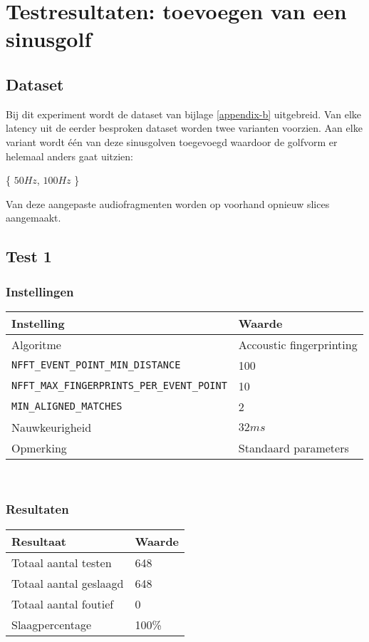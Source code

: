 \chapter{Testresultaten: toevoegen van een sinusgolf}
\label{appendix-d}

\section*{Dataset}

Bij dit experiment wordt de dataset van bijlage \ref{appendix-b} uitgebreid. Van elke latency uit de eerder besproken dataset worden twee varianten voorzien. Aan elke variant wordt één van deze sinusgolven toegevoegd waardoor de golfvorm er helemaal anders gaat uitzien:

\begin{center}
	\{ $50Hz$, $100Hz$ \}
\end{center}

Van deze aangepaste audiofragmenten worden op voorhand opnieuw slices aangemaakt. 

\section*{Test 1}

\subsection*{Instellingen}

\begin{tabular}{ l  l}
	\hline
	\textbf{Instelling} & \textbf{Waarde} \\
	\hline
	Algoritme & Accoustic fingerprinting \\
	\texttt{NFFT\_EVENT\_POINT\_MIN\_DISTANCE} & 100 \\
	\texttt{NFFT\_MAX\_FINGERPRINTS\_PER\_EVENT\_POINT} & 10 \\
	\texttt{MIN\_ALIGNED\_MATCHES} & 2 \\
	Nauwkeurigheid & $32ms$ \\
	Opmerking & Standaard parameters \\
\end{tabular}\\

\subsection*{Resultaten}

\begin{tabular}{ l  l}
	\hline
	\textbf{Resultaat} & \textbf{Waarde} \\
	\hline
	Totaal aantal testen & 648 \\
	Totaal aantal geslaagd & 648 \\
	Totaal aantal foutief & 0 \\
	Slaagpercentage & 100\% \\
\end{tabular}\\

